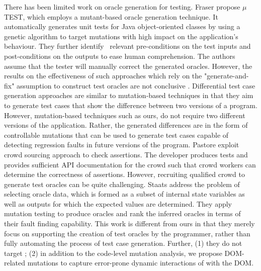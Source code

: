  \label{Sec:oracleGen}
There has been limited work on oracle generation for testing. 
Fraser \etal \cite{fraser:tse12} propose $\mu$TE\-ST, which employs a mutant-based oracle generation technique.  It automatically generates unit tests for Java object-oriented classes by using a genetic algorithm to target mutations with high impact on the application's behaviour. They further identify~\cite{fraser:issta11} relevant pre-conditions on the test inputs and post-conditions on the outputs to ease human comprehension. The authors assume that the tester will manually correct the generated oracles. However, the results on the effectiveness of such approaches which rely on the "generate-and-fix" assumption to construct test oracles are not conclusive \cite{fraser:issta13}.
Differential test case generation approaches \cite{taneja:ase08, elbaum:tse09} are similar to mutation-based techniques in that they aim to generate test cases that show the difference between two versions of a program. However, mutation-based techniques such as ours, do not require two different versions of the application.
Rather, the generated differences are in the form of controllable mutations that can be used to generate test cases capable of detecting
regression faults in future versions of the program.
Pastore \etal \cite{pastore:icst13} exploit crowd sourcing approach to check assertions. The developer produces tests and provides sufficient API documentation for the crowd such that crowd workers can determine the correctness of assertions. However, recruiting qualified crowd to generate test oracles can be quite challenging.
Staats \etal \cite{staats:icse12} address the problem of selecting oracle data,  which is formed as a subset of internal state variables as well as outputs for which the expected values are determined.
They apply mutation testing to produce oracles and rank the inferred oracles in terms of their fault finding capability.
This work is different from ours in that they merely focus on supporting the creation of test oracles by the programmer, rather than fully automating the process of test case generation. Further, (1) they do not target \javascript; 
(2) in addition to the code-level mutation analysis, we propose DOM-related mutations to capture error-prone \cite{Ocariza:esem2013} dynamic interactions of \javascript with the DOM.

 


